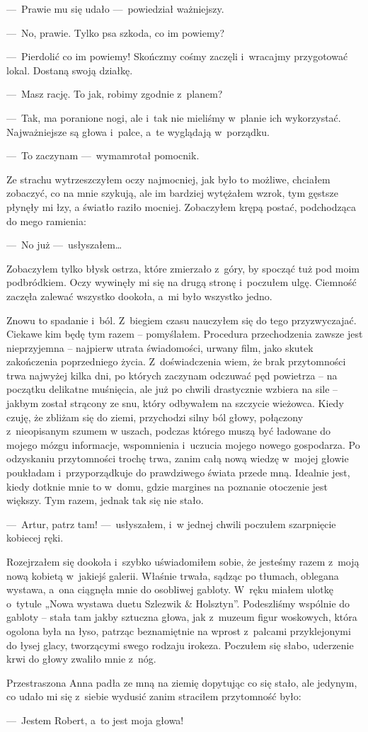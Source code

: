 ---~Prawie mu się udało ---~powiedział ważniejszy.

---~No, prawie. Tylko psa szkoda, co im powiemy?

---~Pierdolić co im powiemy! Skończmy cośmy zaczęli i~wracajmy przygotować lokal. Dostaną swoją działkę.

---~Masz rację. To jak, robimy zgodnie z~planem? 

---~Tak, ma poranione nogi, ale i~tak nie mieliśmy w~planie ich wykorzystać. Najważniejsze są głowa i~palce, a~te wyglądają w~porządku.

---~To zaczynam ---~wymamrotał pomocnik.

Ze strachu wytrzeszczyłem oczy najmocniej, jak było to możliwe, chciałem zobaczyć, co na mnie szykują, ale im bardziej wytężałem wzrok, tym gęstsze płynęły mi łzy, a światło raziło mocniej. Zobaczyłem krępą postać, podchodząca do mego ramienia: 

---~No już ---~usłyszałem…

Zobaczyłem tylko błysk ostrza, które zmierzało z~góry, by spocząć tuż pod moim podbródkiem. Oczy wywinęły mi się na drugą stronę i~poczułem ulgę. Ciemność zaczęła zalewać wszystko dookoła, a~mi było wszystko jedno. 

\paraSep

Znowu to spadanie i~ból. Z~biegiem czasu nauczyłem się do tego przyzwyczajać. Ciekawe kim będę tym razem -- pomyślałem. Procedura przechodzenia zawsze jest nieprzyjemna -- najpierw utrata świadomości, urwany film, jako skutek zakończenia poprzedniego życia. Z~doświadczenia wiem, że brak przytomności trwa najwyżej kilka dni, po których zaczynam odczuwać pęd powietrza -- na początku delikatne muśnięcia, ale już po chwili drastycznie wzbiera na sile -- jakbym został strącony ze snu, który odbywałem na szczycie wieżowca. Kiedy czuję, że zbliżam się do ziemi, przychodzi silny ból głowy, połączony z~nieopisanym szumem w uszach, podczas którego muszą być ładowane do mojego mózgu informacje, wspomnienia i~uczucia mojego nowego gospodarza. Po odzyskaniu przytomności trochę trwa, zanim całą nową wiedzę w~mojej głowie poukładam i~przyporządkuje do prawdziwego świata przede mną. Idealnie jest, kiedy dotknie mnie to w~domu, gdzie margines na poznanie otoczenie jest większy. Tym razem, jednak tak się nie stało. 

---~Artur, patrz tam! ---~usłyszałem, i~w jednej chwili poczułem szarpnięcie kobiecej ręki.
 
Rozejrzałem się dookoła i~szybko uświadomiłem sobie, że jesteśmy razem z~moją nową kobietą w~jakiejś galerii. Właśnie trwała, sądząc po tłumach, oblegana wystawa, a~ona ciągnęła mnie do osobliwej gabloty. W~ręku miałem ulotkę o~tytule „Nowa wystawa duetu Szlezwik \& Holsztyn”. Podeszliśmy wspólnie do gabloty -- stała tam jakby sztuczna głowa, jak z~muzeum figur woskowych, która ogolona była na łyso, patrząc beznamiętnie na wprost z~palcami przyklejonymi do łysej glacy, tworzącymi swego rodzaju irokeza. Poczułem się słabo, uderzenie krwi do głowy zwaliło mnie z~nóg. 

Przestraszona Anna padła ze mną na ziemię dopytując co się stało, ale jedynym, co udało mi się z~siebie wydusić zanim straciłem przytomność było: 

---~Jestem Robert, a~to jest moja głowa!
